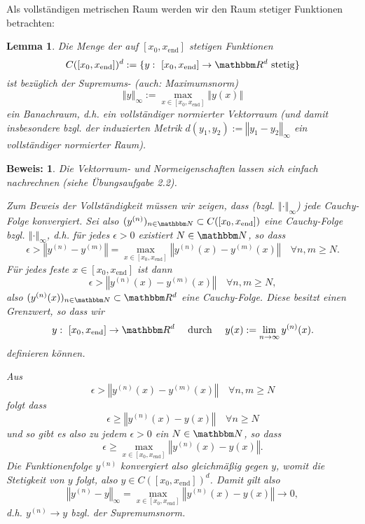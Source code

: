 \documentclass[12pt,a4paper]{book}
\theoremstyle{break}
\newtheorem{lemma}[theorem]{Lemma}
\theoremstyle{nonumberplain}
\newtheorem{beweis}{Beweis:}
\newcommand{\N}{\mathbbm N}
\newcommand{\R}{\mathbbm R}
\newcommand{\norm}[1]{\left\Vert#1\right\Vert}		%
\newcommand{\1}{\mathbbm{1}} 			      	%
\begin{document}
Als vollständigen metrischen Raum werden wir den Raum stetiger Funktionen betrachten:
\begin{lemma}
Die Menge der auf $[x_0,x_\mathrm{end}]$ stetigen Funktionen
\[
C([x_0,x_\mathrm{end}])^d:=\{ y: \ [x_0,x_\mathrm{end}]\to \R^d \ \mathrm{stetig} \} 
\]
ist bezüglich der \emph{Supremums-} (auch: \emph{Maximumsnorm})
\[
\norm{y}_\infty:= \max_{x\in [x_0,x_\mathrm{end}]} \norm{y(x)}
\]
ein \emph{Banachraum}, d.h. ein vollständiger normierter Vektorraum
(und damit insbesondere bzgl. der induzierten Metrik $d(y_1,y_2):=\norm{y_1-y_2}_\infty$ ein 
vollständiger normierter Raum).
\end{lemma}
\begin{beweis}
Die Vektorraum- und Normeigenschaften lassen sich einfach nachrechnen (siehe Übungsaufgabe 2.2).

Zum Beweis der Vollständigkeit müssen wir zeigen, dass (bzgl. $\norm{\cdot}_\infty$) jede Cauchy-Folge
konvergiert. Sei also $(y^ {(n)})_{n\in \N}\subset C([x_0,x_\mathrm{end}])$ eine Cauchy-Folge bzgl. $\norm{\cdot}_\infty$, d.h. für jedes $\epsilon>0$ existiert $N\in \N$, so dass
\[
\epsilon>  \norm{y^{(n)}-y^{(m)}}=  \max_{x\in [x_0,x_\mathrm{end}]}  \norm{y^{(n)}(x)-y^{(m)}(x)} \quad \forall n,m\geq N.
\]
Für jedes feste $x\in [x_0,x_\mathrm{end}]$ ist dann
\[
\epsilon>  \norm{y^{(n)}(x)-y^{(m)}(x)}  \quad \forall n,m\geq N,
\]
also $(y^{(n)}(x))_{n\in \N}\subset \R^d$ eine Cauchy-Folge. Diese besitzt einen Grenzwert,
so dass wir 
\[
y:\ [x_0,x_\mathrm{end}]\to \R^d \quad \mbox{ durch } \quad y(x):=\lim_{n\to \infty} y^{(n)}(x).
\]
definieren können.

Aus 
\[
\epsilon>  \norm{y^{(n)}(x)-y^{(m)}(x)}  \quad \forall n,m\geq N
\]
folgt dass
\[
\epsilon\geq \norm{y^{(n)}(x)-y(x)} \quad \forall n\geq N
\]
und so gibt es also zu jedem $\epsilon>0$ ein $N\in \N$, so dass
\[
\epsilon\geq \max_{x\in [x_0,x_\mathrm{end}]}  \norm{y^{(n)}(x)-y(x)}.
\]
Die Funktionenfolge $y^{(n)}$ konvergiert also gleichmäßig gegen $y$, womit die Stetigkeit von 
$y$ folgt, also $y\in C([x_0,x_\mathrm{end}])^d$. Damit gilt also
\[
\norm{y^{(n)}-y}_\infty = \max_{x\in [x_0,x_\mathrm{end}]}  \norm{y^{(n)}(x)-y(x)}\to 0,
\]
d.h. $y^{(n)}\to y$ bzgl. der Supremumsnorm.
\end{beweis}
\end{document}
